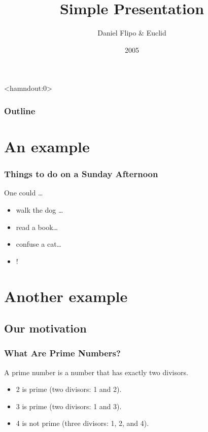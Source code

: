 \documentclass[10pt]{beamer}
\title{Simple Presentation}
\author[D. Flipo, Euclid]{Daniel Flipo \& Euclid}
\institute{U.S.T.L. \& GUTenberg}
\date{2005}
\begin{document}
	\begin{frame}<hamndout:0>
		\titlepage		
	\end{frame}

	\begin{frame}
	\transdissolve[duration=3]

	\frametitle{Outline}
	\tableofcontents
	\end{frame}

	\section{An example}

		\begin{frame}
			\transboxin
			\frametitle{Things to do on a Sunday Afternoon}
			\begin{block}{One could \ldots}
				\begin{itemize}
					\item walk the dog \dots\pause
					\item read a book\dots\pause
					\item confuse a cat\dots\pause
					\item \fbox{solve $y^\prime(x)=\max\{x,y(x)\}$}!
				\end{itemize}
			\end{block}
		\end{frame}
		
	\section{Another example}
				
		\subsection{Our motivation}
		\begin{frame}
				   \transwipe[direction=90]
				   \frametitle{What Are Prime Numbers?}
			\begin{definition}
				A \alert{prime number} is a number that 
				has exactly two divisors.
			\end{definition}
			\begin{example}
					\begin{itemize}
						\item 2 is prime (two divisors: 1 and 2).
						\item 3 is prime (two divisors: 1 and 3).
						\item 4 is not prime (\alert{three} divisors: 
								1, 2, and 4).
					\end{itemize}
			\end{example}
		\end{frame}
		
\end{document}
